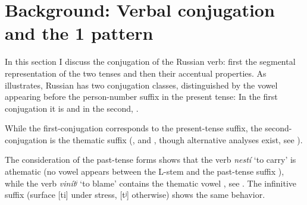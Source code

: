 \documentclass[output=paper,colorlinks,citecolor=black,koreanfont]{langscibook}
\begin{document}
\section{Background: Verbal conjugation and the {1\SG} pattern}\label{mat:sec:Background}
\largerpage[-2]
In this section I discuss the conjugation of the Russian verb: first the segmental representation of the two tenses and then their accentual properties. As   illustrates, Russian has two conjugation classes, distinguished by the vowel appearing before the person-number suffix in the present tense: In the first conjugation it is  and in the second, . 

\begin{table}
\caption{Verbal conjugations, present-tense paradigms: \textit{nestí} ‘to carry’, \textit{vinítʲ} ‘to blame’}
\label{mat:tab:NestiVinit}
\end{table}

While the first-conjugation  corresponds to the present-tense suffix, the second-conjugation  is the thematic suffix (\citealt{Micklesen1973,CoatsLightner1975}, and \citealt[129--130]{Itkin2007}, though alternative analyses exist, see ). 

The consideration of the past-tense forms shows that the verb \textit{nestí} ‘to carry’ is athematic (no vowel appears between the L-stem and the past-tense suffix ), while the verb \textit{vinítʲ} ‘to blame’ contains the thematic vowel , see . The infinitive suffix (surface  [ti] under stress, [tʲ] otherwise) shows the same behavior.
\end{document}
